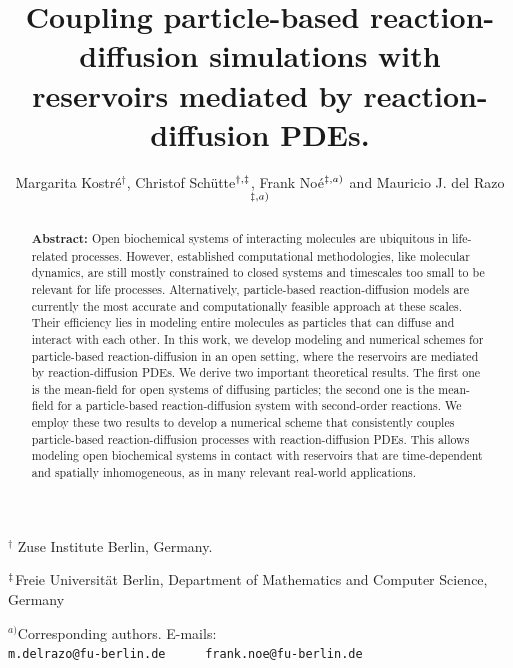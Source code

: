 \documentclass[10pt,twocolumn]{revtex4-1}
\begin{document}
	
	\title{Coupling particle-based reaction-diffusion simulations with reservoirs mediated by reaction-diffusion PDEs.}
	\author{Margarita Kostré$^{\dagger}$, Christof Schütte$^{\dagger, \text{\ddag}}$, Frank Noé$^{\text{\ddag},a)}$ and Mauricio J. del Razo$^{\text{\ddag},a)}$}
	
	
	\begin{abstract}
		\textbf{Abstract:} Open biochemical systems of interacting molecules are ubiquitous in life-related processes. However, established computational methodologies, like molecular dynamics, are still mostly constrained to closed systems and timescales too small to be relevant for life processes. Alternatively, particle-based reaction-diffusion models are currently the most accurate and computationally feasible approach at these scales. Their efficiency lies in modeling entire molecules as particles that can diffuse and interact with each other. In this work, we develop modeling and numerical schemes for particle-based reaction-diffusion in an open setting, where the reservoirs are mediated by reaction-diffusion PDEs. We derive two important theoretical results. The first one is the mean-field for open systems of diffusing particles; the second one is the mean-field for a particle-based reaction-diffusion system with second-order reactions. We employ these two results to develop a numerical scheme that consistently couples particle-based reaction-diffusion processes with reaction-diffusion PDEs. This allows modeling open biochemical systems in contact with reservoirs that are time-dependent and spatially inhomogeneous, as in many relevant real-world applications. 
	\end{abstract}
	
	\maketitle %
	
	\noindent $^{\dagger}$ Zuse Institute Berlin, Germany.
	
	\noindent $^{\text{\ddag}}$Freie Universität Berlin, Department of Mathematics and Computer Science, Germany
	
	\noindent $^{a)}$Corresponding authors. E-mails: \\ \texttt{m.delrazo@fu-berlin.de} \ \ \ \ \ \texttt{frank.noe@fu-berlin.de}
	
\end{document}
